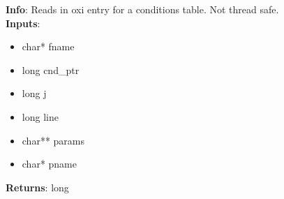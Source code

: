 \textbf{Info}: Reads in oxi entry for a conditions table. Not thread safe. \\

\noindent \textbf{Inputs}:
\begin{itemize}
\item{char* fname}
\item{long cnd\_ptr}
\item{long j}
\item{long line}
\item{char** params}
\item{char* pname}
\end{itemize}

\noindent \textbf{Returns}: long
